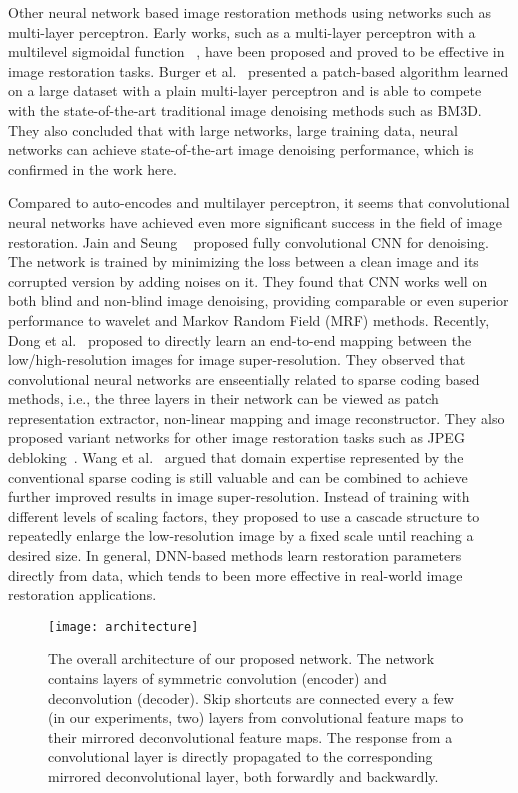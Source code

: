 \documentclass[10pt,journal,compsoc]{IEEEtran}
\begin{document}
Other neural network based image restoration methods using networks such as multi-layer perceptron.
Early works, such as a multi-layer perceptron with a multilevel sigmoidal function
~\cite{DBLP:journals/tsp/SivakumarD93}, have been proposed and proved to be effective in image
restoration tasks. Burger et al.~\cite{DBLP:conf/cvpr/BurgerSH12} presented a patch-based algorithm
learned on a large dataset with a plain multi-layer perceptron and is able to compete with the
state-of-the-art traditional image denoising methods such as BM3D. They also concluded that with large networks,
large training data, neural networks can achieve state-of-the-art image denoising performance,
which is confirmed in the work here.

Compared to auto-encodes and multilayer perceptron, it seems that convolutional neural networks
have achieved even more significant success in the field of image restoration. Jain and Seung
~\cite{DBLP:conf/nips/JainS08} proposed fully convolutional CNN for denoising. The network is
trained by minimizing the loss between a clean image and its corrupted version by adding noises
on it. They found that CNN works well on both blind and non-blind image denoising, providing
comparable or even superior performance to wavelet and Markov Random Field (MRF) methods.
Recently, Dong et al.~\cite{DBLP:journals/pami/DongLHT16} proposed to directly learn an end-to-end
mapping between the low/high-resolution images for image super-resolution. They observed that
convolutional neural networks are enseentially related to sparse coding based methods, i.e.,
the three layers in their network can be viewed as patch representation extractor, non-linear mapping
and image reconstructor. They also proposed variant networks for other image restoration
tasks such as JPEG debloking~\cite{DBLP:conf/iccv/DongDLT15}. Wang et al.~\cite{DBLP:conf/iccv/WangLYHH15}
argued that domain expertise represented by the conventional sparse coding is still valuable
and can be combined to achieve further improved results in image super-resolution. Instead of
training with different levels of scaling factors, they proposed to use a cascade structure to
repeatedly enlarge the low-resolution image by a fixed scale until reaching a desired size.
In general, DNN-based methods learn restoration parameters directly from data, which tends to
been more effective in real-world image restoration applications.
 \begin{figure*}
\centering
\texttt{[image: architecture]}
\caption{The overall architecture of our proposed network. The network
contains layers of symmetric convolution (encoder) and deconvolution (decoder).
Skip shortcuts are connected every a few (in our experiments, two) layers from
convolutional feature maps to their mirrored deconvolutional feature maps.
The response from a convolutional layer is directly propagated to the corresponding
mirrored deconvolutional layer, both forwardly and backwardly.}
\label{fig1}
\end{figure*}
\end{document}
